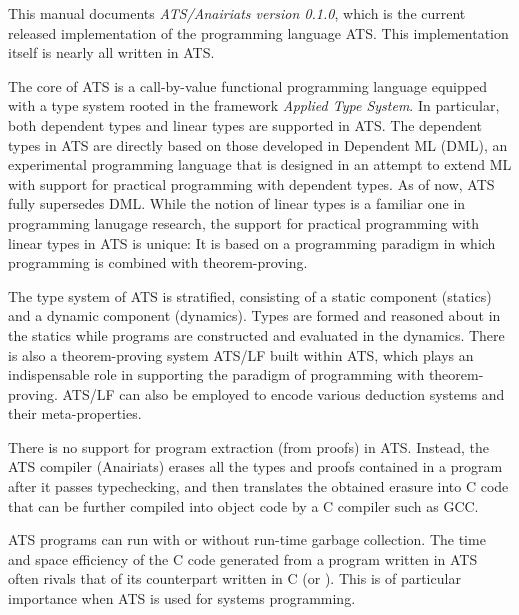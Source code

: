 This manual documents {\em ATS/Anairiats version 0.1.0}, which is the
current released implementation of the programming language ATS. This
implementation itself is nearly all written in ATS.

The core of ATS is a call-by-value functional programming language equipped
with a type system rooted in the framework {\em Applied Type System}. In
particular, both dependent types and linear types are supported in ATS. The
dependent types in ATS are directly based on those developed in Dependent
ML (DML), an experimental programming language that is designed in an
attempt to extend ML with support for practical programming with dependent
types. As of now, ATS fully supersedes DML. While the notion of linear
types is a familiar one in programming lanugage research, the support for
practical programming with linear types in ATS is unique: It is based on a
programming paradigm in which programming is combined with theorem-proving.

The type system of ATS is stratified, consisting of a static component
(statics) and a dynamic component (dynamics). Types are formed and reasoned
about in the statics while programs are constructed and evaluated in the
dynamics. There is also a theorem-proving system ATS/LF built within ATS,
which plays an indispensable role in supporting the paradigm of programming
with theorem-proving. ATS/LF can also be employed to encode various
deduction systems and their meta-properties.

There is no support for program extraction (from proofs) in ATS. Instead,
the ATS compiler (Anairiats) erases all the types and proofs contained in a
program after it passes typechecking, and then translates the obtained
erasure into C code that can be further compiled into object code by a C
compiler such as GCC.

ATS programs can run with or without run-time garbage collection. The time
and space efficiency of the C code generated from a program written in ATS
often rivals that of its counterpart written in C (or \cplusplus). This is of
particular importance when ATS is used for systems programming.

